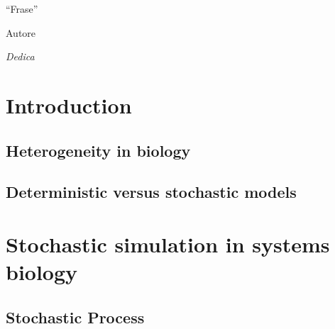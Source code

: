 \documentclass[12pt,a4paper]{report}
\begin{document}
\newpage
\thispagestyle{empty}
\mbox{}
\newpage





\thispagestyle{empty} %
\epigraph{``Frase''}{Autore}



\newpage
\thispagestyle{empty}
\mbox{}
\newpage

\thispagestyle{empty}
\begin{flushright}
 \emph{Dedica}
\end{flushright}

\newpage
\thispagestyle{empty}
\mbox{}
\newpage

\begin{abstract}
 
\end{abstract}

\newpage
\tableofcontents
\newpage

\chapter{Introduction}
\section{Heterogeneity in biology}
\section{Deterministic versus stochastic models}

\chapter{Stochastic simulation in systems biology}
\section{Stochastic Process}
\end{document}
